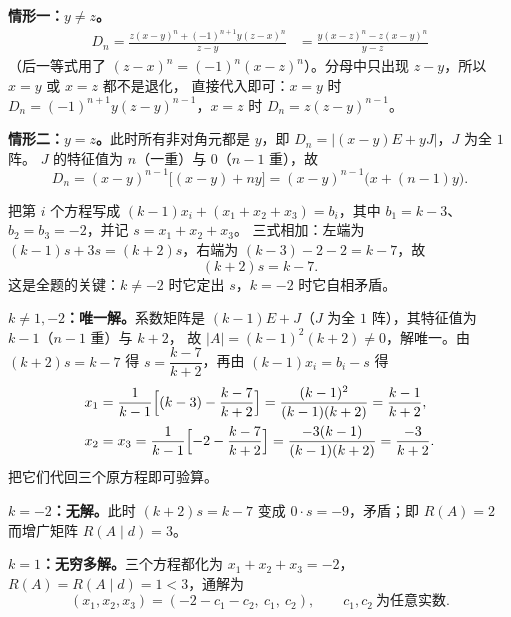 \begin{solution}
\textbf{情形一：$y\ne z$。}
\begin{align*}
D_n=\frac{z(x-y)^{n}+(-1)^{n+1}y(z-x)^{n}}{z-y}
&=\frac{y(x-z)^{n}-z(x-y)^{n}}{y-z}
\end{align*}
（后一等式用了 $(z-x)^{n}=(-1)^{n}(x-z)^{n}$）。分母中只出现 $z-y$，所以 $x=y$ 或 $x=z$ 都不是退化，
直接代入即可：$x=y$ 时 $D_n=(-1)^{n+1}y(z-y)^{n-1}$，$x=z$ 时 $D_n=z(z-y)^{n-1}$。

\textbf{情形二：$y=z$。}此时所有非对角元都是 $y$，即 $D_n=\bigl|(x-y)E+yJ\bigr|$，$J$ 为全 $1$ 阵。
$J$ 的特征值为 $n$（一重）与 $0$（$n-1$ 重），故
\[
D_n=(x-y)^{n-1}\bigl[(x-y)+ny\bigr]=(x-y)^{n-1}\bigl(x+(n-1)y\bigr).
\]
\end{solution}

\begin{solution}
把第 $i$ 个方程写成 $(k-1)x_i+(x_1+x_2+x_3)=b_i$，其中 $b_1=k-3$、$b_2=b_3=-2$，并记 $s=x_1+x_2+x_3$。
三式相加：左端为 $(k-1)s+3s=(k+2)s$，右端为 $(k-3)-2-2=k-7$，故
\[
(k+2)s=k-7 .
\]
这是全题的关键：$k\ne-2$ 时它定出 $s$，$k=-2$ 时它自相矛盾。

\textbf{$k\ne1,-2$：唯一解。}系数矩阵是 $(k-1)E+J$（$J$ 为全 $1$ 阵），其特征值为 $k-1$（$n-1$ 重）与 $k+2$，
故 $|A|=(k-1)^{2}(k+2)\ne0$，解唯一。由 $(k+2)s=k-7$ 得 $s=\dfrac{k-7}{k+2}$，再由 $(k-1)x_i=b_i-s$ 得
\begin{align*}
x_1&=\frac{1}{k-1}\Bigl[(k-3)-\frac{k-7}{k+2}\Bigr]
=\frac{(k-1)^{2}}{(k-1)(k+2)}=\frac{k-1}{k+2},\\
x_2&=x_3=\frac{1}{k-1}\Bigl[-2-\frac{k-7}{k+2}\Bigr]
=\frac{-3(k-1)}{(k-1)(k+2)}=\frac{-3}{k+2}.
\end{align*}
把它们代回三个原方程即可验算。

\textbf{$k=-2$：无解。}此时 $(k+2)s=k-7$ 变成 $0\cdot s=-9$，矛盾；即 $R(A)=2$ 而增广矩阵 $R(A\mid d)=3$。

\textbf{$k=1$：无穷多解。}三个方程都化为 $x_1+x_2+x_3=-2$，$R(A)=R(A\mid d)=1<3$，通解为
\[
(x_1,x_2,x_3)=(-2-c_1-c_2,\ c_1,\ c_2),\qquad c_1,c_2\ \text{为任意实数}.
\]
\end{solution}

